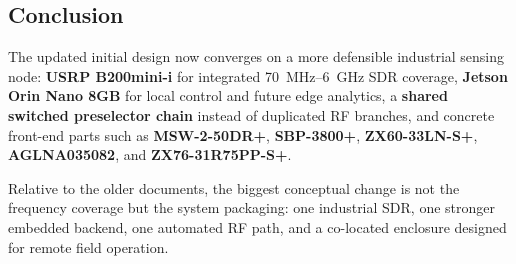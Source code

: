 \documentclass[11pt,a4paper]{article}
\begin{document}
\subsection*{Conclusion}

The updated initial design now converges on a more defensible industrial sensing
node: \textbf{USRP B200mini-i} for integrated 70~MHz--6~GHz SDR coverage,
\textbf{Jetson Orin Nano 8GB} for local control and future edge analytics, a
\textbf{shared switched preselector chain} instead of duplicated RF branches, and
concrete front-end parts such as \textbf{MSW-2-50DR+},
\textbf{SBP-3800+}, \textbf{ZX60-33LN-S+}, \textbf{AGLNA035082}, and
\textbf{ZX76-31R75PP-S+}.

Relative to the older documents, the biggest conceptual change is not the
frequency coverage but the system packaging: one industrial SDR, one stronger
embedded backend, one automated RF path, and a co-located enclosure designed for
remote field operation.
\end{document}
